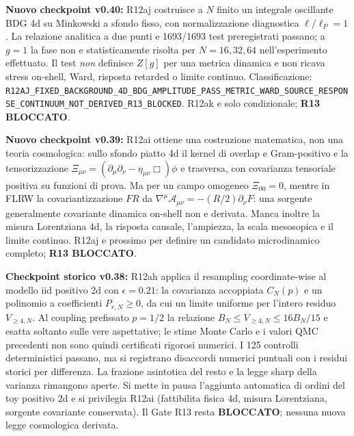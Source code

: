 \documentclass[11pt,a4paper]{article}
\begin{document}
\textbf{Nuovo checkpoint v0.40:} R12aj costruisce a $N$ finito un integrale oscillante BDG 4d su Minkowski a sfondo fisso, con normalizzazione diagnostica $\ell/\ell_P=1$. La relazione analitica a due punti e 1693/1693 test preregistrati passano; a $g=1$ la fase non e statisticamente risolta per $N=16,32,64$ nell'esperimento effettuato. Il test \emph{non} definisce $Z[g]$ per una metrica dinamica e non ricava stress on-shell, Ward, risposta retarded o limite continuo. Classificazione: \nolinkurl{R12AJ_FIXED_BACKGROUND_4D_BDG_AMPLITUDE_PASS_METRIC_WARD_SOURCE_RESPONSE_CONTINUUM_NOT_DERIVED_R13_BLOCKED}. R12ak e solo condizionale; \textbf{R13 BLOCCATO}.\par\medskip


\textbf{Nuovo checkpoint v0.39:} R12ai ottiene una costruzione matematica, non una teoria cosmologica: sullo sfondo piatto 4d il kernel di overlap e Gram-positivo e la tensorizzazione $\Xi_{\mu\nu}=(\partial_\mu\partial_\nu-\eta_{\mu\nu}\Box)\phi$ e trasversa, con covarianza tensoriale positiva su funzioni di prova. Ma per un campo omogeneo $\Xi_{00}=0$, mentre in FLRW la covariantizzazione $F R$ da $\nabla^\mu\mathcal A_{\mu\nu}=-(R/2)\partial_\nu F$: una sorgente generalmente covariante dinamica on-shell non e derivata. Manca inoltre la misura Lorentziana 4d, la risposta causale, l'ampiezza, la scala mesosopica e il limite continuo. R12aj e prossimo per definire un candidato microdinamico completo; \textbf{R13 BLOCCATO}.\par\medskip

\textbf{Checkpoint storico v0.38:} R12ah applica il resampling coordinate-wise al modello iid positivo 2d con $\epsilon=0.21$: la covarianza accoppiata $C_N(p)$ e un polinomio a coefficienti $P_{r,N}\ge0$, da cui un limite uniforme per l'intero residuo $V_{\ge4,N}$. Al coupling prefissato $p=1/2$ la relazione $B_N\le V_{\ge4,N}\le16B_N/15$ e esatta soltanto sulle vere aspettative; le stime Monte Carlo e i valori QMC precedenti non sono quindi certificati rigorosi numerici. I 125 controlli deterministici passano, ma si registrano disaccordi numerici puntuali con i residui storici per differenza. La frazione asintotica del resto e la legge sharp della varianza rimangono aperte. Si mette in pausa l'aggiunta automatica di ordini del toy positivo 2d e si privilegia R12ai (fattibilita fisica 4d, misura Lorentziana, sorgente covariante conservata). Il Gate R13 resta \textbf{BLOCCATO}; nessuna nuova legge cosmologica derivata.\par\medskip
\end{document}
